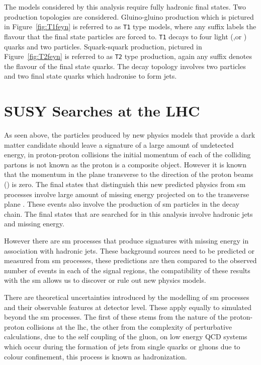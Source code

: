 The models considered by this analysis require fully hadronic final states. Two 
production topologies are considered. Gluino-gluino production which is 
pictured in Figure~\ref{fig:T1feyn} is referred to as \texttt{T1} type models, 
where any suffix labels the flavour that the final state particles are forced 
to. \texttt{T1} decays to four light (\Pup,\Pdown or \Pcharm) quarks and two 
\PSneutralino particles.
Squark-squark production, pictured in Figure~\ref{fig:T2feyn} is referred to as 
\texttt{T2} type production, again 
any suffix denotes the flavour of the final state quarks. The decay topology 
involves two \PSneutralino particles and two final state quarks which hadronise 
to form jets.


\section{SUSY Searches at the LHC} %
\label{cha:motivating_the_alt_analysis}

As seen above, the particles produced by new physics models that provide a dark 
matter candidate should leave a signature of a large amount of undetected 
energy, in proton-proton collisions the initial momentum of each of the 
colliding partons is not known as the proton is a composite object. However it 
is known that the momentum in the plane transverse to the direction of the 
proton beams (\pt) is zero. The final states that distinguish this new 
predicted physics from \ac{sm} processes involve large amount of missing energy 
projected on to the transverse plane \ETm. These events also involve the 
production of \ac{sm} particles in the decay chain. The final states that are 
searched for in this analysis involve hadronic jets and missing energy.

However there are \ac{sm} processes that produce signatures with missing energy 
in association with hadronic jets. These background sources need to be 
predicted or measured from \ac{sm} processes, these predictions are then 
compared to the observed number of events in each of the signal regions, the 
compatibility of these results with the \ac{sm} allows us to discover or rule 
out new physics models.

There are theoretical uncertainties introduced by the modelling of \ac{sm} 
processes and their observable features at detector level. These apply equally 
to simulated beyond the \ac{sm} processes. The first of these stems from the 
nature of the proton-proton collisions at the \ac{lhc}, the other from the 
complexity of perturbative calculations, due to the self coupling of the gluon, 
on low energy QCD systems which occur during the formation of jets from single 
quarks or gluons due to colour confinement, this process is known as 
hadronization.

